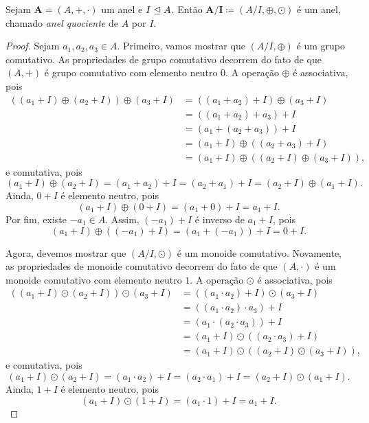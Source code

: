 \begin{prop}
	Sejam $\bm A=(A,+,\cdot)$ um anel e $I \mathrel{\unlhd} A$. Então $\bm{A/I} \coloneqq (A/I,\oplus,\odot)$ é um anel, chamado \emph{anel quociente} de $A$ por $I$.
\end{prop}
\begin{proof}
	Sejam $a_1,a_2,a_3 \in A$. Primeiro, vamos mostrar que $(A/I,\oplus)$ é um grupo comutativo. As propriedades de grupo comutativo decorrem do fato de que $(A,+)$ é grupo comutativo com elemento neutro $0$. A operação $\oplus$ é associativa, pois
	\begin{align*}
	((a_1+I) \oplus (a_2+I)) \oplus (a_3+I) &= ((a_1+a_2)+I) \oplus (a_3+I) \\
		&= ((a_1+a_2)+a_3)+I \\
		&= (a_1+(a_2+a_3))+I \\
		&= (a_1+I) \oplus ((a_2+a_3)+I) \\
		&= (a_1+I) \oplus ((a_2+I) \oplus (a_3+I)),
	\end{align*}
e comutativa, pois
	\begin{equation*}
	(a_1+I) \oplus (a_2+I) = (a_1+a_2)+I = (a_2+a_1)+I = (a_2+I) \oplus (a_1+I).
	\end{equation*}
Ainda, $0+I$ é elemento neutro, pois
	\begin{equation*}
	(a_1+I) \oplus (0+I) = (a_1+0)+I = a_1+I.
	\end{equation*}
Por fim, existe $-a_1 \in A$. Assim, $(-a_1)+I$ é inverso de $a_1+I$, pois
	\begin{equation*}
	(a_1+I) \oplus ((-a_1)+I) = (a_1+(-a_1))+I = 0+I.
	\end{equation*}

	Agora, devemos mostrar que $(A/I,\odot)$ é um monoide comutativo. Novamente, as propriedades de monoide comutativo decorrem do fato de que $(A,\cdot)$ é um monoide comutativo com elemento neutro $1$. A operação $\odot$ é associativa, pois
	\begin{align*}
	((a_1+I) \odot (a_2+I)) \odot (a_3+I) &= ((a_1 \cdot a_2)+I) \odot (a_3+I) \\
		&= ((a_1 \cdot a_2) \cdot a_3)+I \\
		&= (a_1 \cdot (a_2 \cdot a_3))+I \\
		&= (a_1+I) \odot ((a_2 \cdot a_3)+I) \\
		&= (a_1+I) \odot ((a_2+I) \odot (a_3+I)),
	\end{align*}
e comutativa, pois
	\begin{equation*}
	(a_1+I) \odot (a_2+I) = (a_1 \cdot a_2)+I = (a_2 \cdot a_1)+I = (a_2+I) \odot (a_1+I).
	\end{equation*}
Ainda, $1+I$ é elemento neutro, pois
	\begin{equation*}
	(a_1+I) \odot (1+I) = (a_1 \cdot 1)+I = a_1+I.
	\end{equation*}


\end{proof}
